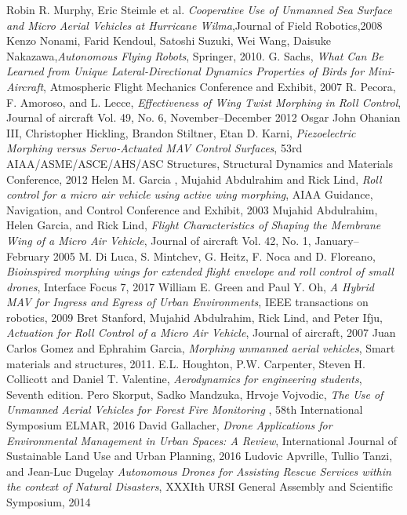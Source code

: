 \documentclass[12pt,a4paper]{article}
\begin{document}
\begin{thebibliography}{100}
	 Robin R. Murphy, Eric Steimle et al. \textit{Cooperative Use of Unmanned Sea Surface and Micro Aerial Vehicles at Hurricane Wilma},Journal of Field Robotics,2008
	     Kenzo Nonami, Farid Kendoul, Satoshi Suzuki, Wei Wang, Daisuke Nakazawa,\textit{Autonomous Flying Robots}, Springer, 2010.
	 G. Sachs, \textit{What Can Be Learned from Unique Lateral-Directional Dynamics Properties of Birds for Mini-Aircraft}, Atmospheric Flight Mechanics Conference and Exhibit, 2007
	 R. Pecora, F. Amoroso, and L. Lecce, \textit{Effectiveness of Wing Twist Morphing in Roll Control}, Journal of aircraft Vol. 49, No. 6, November–December 2012
	 Osgar John Ohanian III, Christopher Hickling, Brandon Stiltner, Etan D. Karni, \textit{Piezoelectric Morphing versus Servo-Actuated MAV Control Surfaces}, 53rd AIAA/ASME/ASCE/AHS/ASC Structures, Structural Dynamics and Materials Conference, 2012
	 Helen M. Garcia , Mujahid Abdulrahim and Rick Lind, \textit{Roll control for a micro air vehicle using active wing morphing}, AIAA Guidance, Navigation, and Control Conference and Exhibit, 2003
	 Mujahid Abdulrahim, Helen Garcia, and Rick Lind, \textit{Flight Characteristics of Shaping the Membrane Wing of a Micro Air Vehicle}, Journal of aircraft Vol. 42, No. 1, January–February 2005
	 M. Di Luca, S. Mintchev, G. Heitz, F. Noca and D. Floreano, \textit{Bioinspired morphing wings for extended flight envelope and roll control of small drones}, Interface Focus 7, 2017
	 William E. Green and Paul Y. Oh, \textit{A Hybrid MAV for Ingress and Egress of Urban Environments}, IEEE transactions on robotics, 2009
	 Bret Stanford, Mujahid Abdulrahim, Rick Lind, and Peter Ifju, \textit{Actuation for Roll Control of a Micro Air Vehicle}, Journal of aircraft,  2007
	 Juan Carlos Gomez and Ephrahim Garcia, \textit{Morphing unmanned aerial vehicles}, Smart materials and structures, 2011.
	 E.L. Houghton, P.W. Carpenter, Steven H. Collicott and Daniel T. Valentine, \textit{Aerodynamics for engineering students}, Seventh edition.
	 Pero Skorput, Sadko Mandzuka, Hrvoje Vojvodic, \textit{The Use of Unmanned Aerial Vehicles for Forest Fire Monitoring }, 58th International Symposium ELMAR, 2016
	 David Gallacher, \textit{Drone Applications for Environmental Management in Urban Spaces: A Review}, International Journal of Sustainable Land Use and Urban Planning, 2016
	 Ludovic Apvrille, Tullio Tanzi, and Jean-Luc Dugelay \textit{Autonomous Drones for Assisting Rescue Services within the context of Natural Disasters}, XXXIth URSI General Assembly and Scientific Symposium, 2014
\end{thebibliography}

\listoffigures
\listoftables
\appendix
\end{document}
